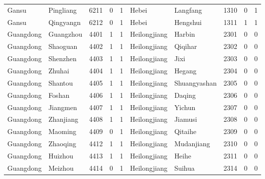 \begin{table}[!htbp]
\begin{adjustbox}{width=\textwidth, totalheight=\baselineskip,keepaspectratio}
\begin{tabular}{llllllllll}
Gansu     & Pingliang & 6211 & 0   & 1   & Hebei        & Langfang      & 1310 & 0   & 1   \\
Gansu     & Qingyangn & 6212 & 0   & 1   & Hebei        & Hengshui      & 1311 & 1   & 1   \\
Guangdong & Guangzhou & 4401 & 1   & 1   & Heilongjiang & Harbin        & 2301 & 0   & 0   \\
Guangdong & Shaoguan  & 4402 & 1   & 1   & Heilongjiang & Qiqihar       & 2302 & 0   & 0   \\
Guangdong & Shenzhen  & 4403 & 1   & 1   & Heilongjiang & Jixi          & 2303 & 0   & 0   \\
Guangdong & Zhuhai    & 4404 & 1   & 1   & Heilongjiang & Hegang        & 2304 & 0   & 0   \\
Guangdong & Shantou   & 4405 & 1   & 1   & Heilongjiang & Shuangyashan  & 2305 & 0   & 0   \\
Guangdong & Foshan    & 4406 & 1   & 1   & Heilongjiang & Daqing        & 2306 & 0   & 0   \\
Guangdong & Jiangmen  & 4407 & 1   & 1   & Heilongjiang & Yichun        & 2307 & 0   & 0   \\
Guangdong & Zhanjiang & 4408 & 1   & 1   & Heilongjiang & Jiamusi       & 2308 & 0   & 0   \\
Guangdong & Maoming   & 4409 & 0   & 1   & Heilongjiang & Qitaihe       & 2309 & 0   & 0   \\
Guangdong & Zhaoqing  & 4412 & 1   & 1   & Heilongjiang & Mudanjiang    & 2310 & 0   & 0   \\
Guangdong & Huizhou   & 4413 & 1   & 1   & Heilongjiang & Heihe         & 2311 & 0   & 0   \\
Guangdong & Meizhou   & 4414 & 0   & 1   & Heilongjiang & Suihua        & 2314 & 0   & 0  
\end{tabular}
\end{adjustbox}
\end{table}

